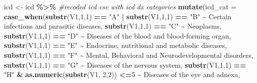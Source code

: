 \documentclass[preprint, 3p,
authoryear]{elsarticle} %
\newenvironment{Shaded}{\begin{snugshade}}{\end{snugshade}}
\newcommand{\CommentTok}[1]{\textcolor[rgb]{0.56,0.35,0.01}{\textit{#1}}}
\newcommand{\DataTypeTok}[1]{\textcolor[rgb]{0.13,0.29,0.53}{#1}}
\newcommand{\DecValTok}[1]{\textcolor[rgb]{0.00,0.00,0.81}{#1}}
\newcommand{\KeywordTok}[1]{\textcolor[rgb]{0.13,0.29,0.53}{\textbf{#1}}}
\newcommand{\NormalTok}[1]{#1}
\newcommand{\OperatorTok}[1]{\textcolor[rgb]{0.81,0.36,0.00}{\textbf{#1}}}
\newcommand{\StringTok}[1]{\textcolor[rgb]{0.31,0.60,0.02}{#1}}
\begin{document}
\begin{Shaded}
\begin{Highlighting}[]
\NormalTok{icd \textless{}{-}}\StringTok{ }\NormalTok{icd }\OperatorTok{\%\textgreater{}\%}\StringTok{ }\CommentTok{\#recoded icd csv with icd dx categories}
\StringTok{  }\KeywordTok{mutate}\NormalTok{(}\DataTypeTok{icd\_cat =} \KeywordTok{case\_when}\NormalTok{(}\KeywordTok{substr}\NormalTok{(V1,}\DecValTok{1}\NormalTok{,}\DecValTok{1}\NormalTok{) }\OperatorTok{==}\StringTok{ "A"} \OperatorTok{|}\StringTok{ }\KeywordTok{substr}\NormalTok{(V1,}\DecValTok{1}\NormalTok{,}\DecValTok{1}\NormalTok{) }\OperatorTok{==}\StringTok{ "B"} \OperatorTok{\textasciitilde{}}\StringTok{ \textquotesingle{}Certain infections and parasitic diseases\textquotesingle{}}\NormalTok{,}
                             \KeywordTok{substr}\NormalTok{(V1,}\DecValTok{1}\NormalTok{,}\DecValTok{1}\NormalTok{) }\OperatorTok{==}\StringTok{ "C"} \OperatorTok{\textasciitilde{}}\StringTok{ \textquotesingle{}Neoplasms\textquotesingle{}}\NormalTok{,}
                             \KeywordTok{substr}\NormalTok{(V1,}\DecValTok{1}\NormalTok{,}\DecValTok{1}\NormalTok{) }\OperatorTok{==}\StringTok{ "D"} \OperatorTok{\textasciitilde{}}\StringTok{ \textquotesingle{}Diseases of the blood and blood{-}forming organ\textquotesingle{}}\NormalTok{,}
                              \KeywordTok{substr}\NormalTok{(V1,}\DecValTok{1}\NormalTok{,}\DecValTok{1}\NormalTok{) }\OperatorTok{==}\StringTok{ "E"} \OperatorTok{\textasciitilde{}}\StringTok{ \textquotesingle{}Endocrine, nutritional and metabolic diseases\textquotesingle{}}\NormalTok{,}
                              \KeywordTok{substr}\NormalTok{(V1,}\DecValTok{1}\NormalTok{,}\DecValTok{1}\NormalTok{) }\OperatorTok{==}\StringTok{ "F"} \OperatorTok{\textasciitilde{}}\StringTok{ \textquotesingle{}Mental, Behavioral and Neurodevelopmental disorders\textquotesingle{}}\NormalTok{,}
                              \KeywordTok{substr}\NormalTok{(V1,}\DecValTok{1}\NormalTok{,}\DecValTok{1}\NormalTok{) }\OperatorTok{==}\StringTok{ "G"} \OperatorTok{\textasciitilde{}}\StringTok{ \textquotesingle{}Diseases of the nervous system\textquotesingle{}}\NormalTok{,}
                              \KeywordTok{substr}\NormalTok{(V1,}\DecValTok{1}\NormalTok{,}\DecValTok{1}\NormalTok{) }\OperatorTok{==}\StringTok{ "H"} \OperatorTok{\&}\StringTok{ }\KeywordTok{as.numeric}\NormalTok{(}\KeywordTok{substr}\NormalTok{(V1, }\DecValTok{2}\NormalTok{,}\DecValTok{2}\NormalTok{)) }\OperatorTok{\textless{}=}\DecValTok{5} \OperatorTok{\textasciitilde{}}\StringTok{ \textquotesingle{}Diseases of the eye and adnexa\textquotesingle{}}\NormalTok{,}

\end{Highlighting}
\end{Shaded}
\end{document}
